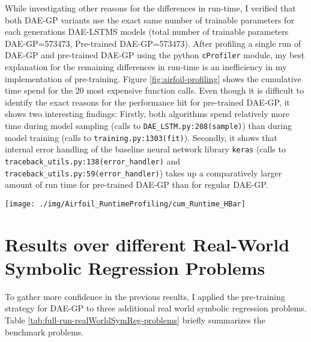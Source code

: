 \documentclass[
  11pt,
]{article}
\let\origfigure\figure
\let\endorigfigure\endfigure
\renewenvironment{figure}[1][2] {
    \expandafter\origfigure\expandafter[H]
} {
    \endorigfigure
}
\begin{document}
While investigating other reasons for the differences in run-time, I verified that both DAE-GP variants use the exact same number of trainable parameters for each generations DAE-LSTMS models (total number of trainable parameters DAE-GP=573473, Pre-trained DAE-GP=573473). After profiling a single run of DAE-GP and pre-trained DAE-GP using the python \texttt{cProfiler} module, my best explanation for the remaining differences in run-time is an inefficiency in my implementation of pre-training. Figure \ref{fig:airfoil-profiling} shows the cumulative time spend for the 20 most expensive function calls. Even though it is difficult to identify the exact reasons for the performance hit for pre-trained DAE-GP, it shows two interesting findings: Firstly, both algorithms spend relatively more time during model sampling (calls to \texttt{DAE\_LSTM.py:208(sample)}) than during model training (calls to \texttt{training.py:1303(fit)}). Secondly, it shows that internal error handling of the baseline neural network library \texttt{keras} (calls to \texttt{traceback\_utils.py:138(error\_handler)} and \texttt{traceback\_utils.py:59(error\_handler)}) takes up a comparatively larger amount of run time for pre-trained DAE-GP than for regular DAE-GP.

\begin{figure}[c]

{\centering \texttt{[image: ./img/Airfoil\_RuntimeProfiling/cum\_Runtime\_HBar]} 

}

\caption{Cumulative Time consumption by Function Calls (Top 20) - Airfoil}\label{fig:airfoil-profiling}
\end{figure}

\hypertarget{results-over-different-real-world-symbolic-regression-problems}{%
\section{Results over different Real-World Symbolic Regression Problems}\label{results-over-different-real-world-symbolic-regression-problems}}

To gather more confidence in the previous results, I applied the pre-training strategy for DAE-GP to three additional real world symbolic regression problems. Table \ref{tab:full-run-realWorldSymReg-problems} briefly summarizes the benchmark problems.
\end{document}
